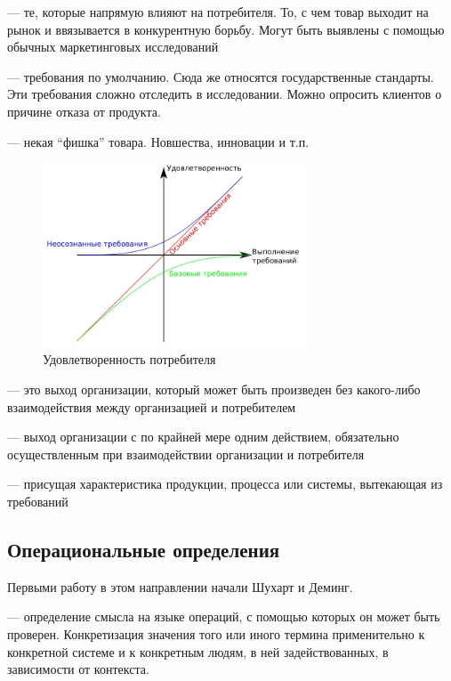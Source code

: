 \documentclass[a4paper, 14pt]{extarticle}
\begin{document}
 --- те, которые напрямую влияют на потребителя. То, с чем товар выходит на рынок и ввязывается в конкурентную борьбу. Могут быть выявлены с помощью обычных маркетинговых исследований

 --- требования по умолчанию. Сюда же относятся государственные стандарты. Эти требования сложно отследить в исследовании. Можно опросить клиентов о причине отказа от продукта.

 --- некая ``фишка'' товара. Новшества, инновации и т.п.

\begin{figure}[h]
    \centering
    \includegraphics[width=0.7\textwidth]{./img/L2/S002.jpg}
    \caption{Удовлетворенность потребителя}%
    \label{img:l2:2}
\end{figure}

 --- это выход организации, который может быть произведен без какого-либо взаимодействия между организацией и потребителем

 --- выход организации с по крайней мере одним действием, обязательно осуществленным при взаимодействии организации и потребителя

 --- присущая характеристика продукции, процесса или системы, вытекающая из требований

\subsection{Операциональные определения}
Первыми работу в этом направлении начали Шухарт и Деминг.

 --- определение смысла на языке операций, с помощью которых он может быть проверен. Конкретизация значения того или иного термина применительно к конкретной системе и к конкретным людям, в ней задействованных, в зависимости от контекста. 
\end{document}
